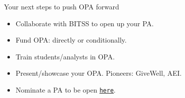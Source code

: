 \documentclass{beamer}
\def\blue{\color{blue}}
\begin{document}
\begin{frame}{What lies ahead}

\end{itemize}
\end{frame}

\begin{frame}{Your next steps to push OPA forward}
\begin{itemize}
\item Collaborate with BITSS to open up your PA. 
\item Fund OPA: directly or conditionally.
\item Train students/analysts in OPA.
\item Present/showcase your OPA. Pioneers: GiveWell, AEI.  
\item Nominate a PA to be open {\blue\texttt{\href{https://goo.gl/forms/ImKnRb5pJWt5apcJ2}{\underline{here}}}}. 
\end{itemize}
\end{frame}
\end{document}
